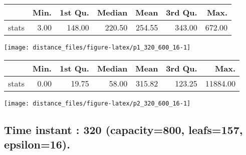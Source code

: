 \documentclass[
  9pt,
  landscape]{article}
\begin{document}
\begin{minipage}{0.5\textwidth} 
\centering 
\begin{tabular}{rrrrrrr}
  \hline
 & Min. & 1st Qu. & Median & Mean & 3rd Qu. & Max. \\ 
  \hline
stats & 3.00 & 148.00 & 220.50 & 254.55 & 343.00 & 672.00 \\ 
   \hline
\end{tabular}
\vspace{0.5cm} 


\texttt{[image: distance\_files/figure-latex/p1\_320\_600\_16-1]} 

\end{minipage} 
\begin{minipage}{0.5\textwidth} 
\centering 
\begin{tabular}{rrrrrrr}
  \hline
 & Min. & 1st Qu. & Median & Mean & 3rd Qu. & Max. \\ 
  \hline
stats & 0.00 & 19.75 & 58.00 & 315.82 & 123.25 & 11884.00 \\ 
   \hline
\end{tabular}
\vspace{0.5cm} 


\texttt{[image: distance\_files/figure-latex/p2\_320\_600\_16-1]} 

\end{minipage}

\pagebreak

\hypertarget{time-instant-320-capacity800-leafs157-epsilon16.}{%
\subsection{Time instant : 320 (capacity=800, leafs=157,
epsilon=16).}\label{time-instant-320-capacity800-leafs157-epsilon16.}}
\end{document}
